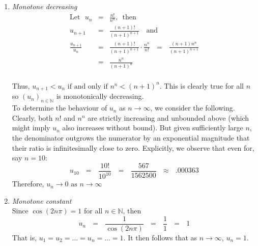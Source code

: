 \documentclass[12pt]{amsart}
\begin{document}
\begin{enumerate}
\begin{enumerate}
			\item \emph{Monotone decreasing}
				\begin{eqnarray}
					\text{Let} \text{ } u_n & = & \frac{n!}{n^n} \text{, } \text{ then} \nonumber \\
					u_{n+1}  & = & \frac{(n+1)!}{(n+1)^{n+1}} \text{ }\text{ and} \nonumber \\
					\frac{u_{n+1}}{u_n} & = & \frac{(n+1)!}{(n+1)^{n+1}} \cdot \frac{n^n}{n!} \text { } = 
					\text{ } \frac{(n+1)n^n}{(n+1)^{n+1}}  \nonumber  \\
					& = & \frac{n^n}{(n+1)^n} \nonumber
				\end{eqnarray}\\
			Thus, $u_{n+1} < u_n \text { if and only if } n^n < (n+1)^n$. This is clearly true for all $n$ 					so $(u_n)_{n \in \mathbb{N}}$ is monotonically decreasing. \\
			To determine the behaviour of $u_n$ as $n \rightarrow \infty$, we consider the 						following.  Clearly, both $n!$ and $n^n$ are strictly increasing and unbounded above (which
			might imply $u_n$ also increases without bound). But given sufficiently large $n$, the 						denominator outgrows the numerator by an exponential magnitude that their ratio is 					infinitesimally close to zero. Explicitly, we observe that even for, say $n=10:$
			$$u_{10} \text{ } = \text{ } \frac{10!}{10^{10}} \text{ } = \text{ } \frac{567}{1562500} \text{ } \approx 			\text{ } .000363$$ 
			Therefore, $u_n \rightarrow 0 \text{ as } n \rightarrow \infty$
						
			\item \emph{Monotone constant}\\
			Since $\cos(2n\pi) = 1$ for all $n \in \mathbb{N}$, then 
			$$u_n \text{ } = \text{ } \frac{1}{\cos(2n\pi)} \text{ } = \text{ } \frac{1}{1} \text{ } = \text{ }1$$
			That is, $u_1=u_2= ... = u_n  = ... = 1$.  It then follows that as $n \rightarrow \infty$, $u_n = 1$.\\
			

\end{enumerate}
\end{enumerate}
\end{document}

